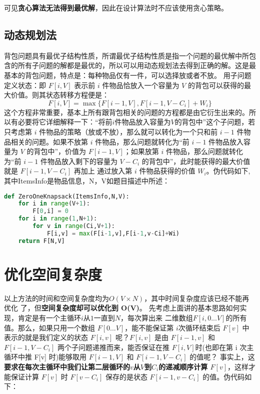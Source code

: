 可见\textbf{贪心算法无法得到最优解}，因此在设计算法时不应该使用贪心策略。

\subsection{动态规划法}
背包问题具有最优子结构性质，所谓最优子结构性质是指一个问题的最优解中所包含的所有子问题的解都是最优的，所以可以用动态规划法去得到正确的解。这是最基本的背包问题，特点是：每种物品仅有一件，可以选择放或者不放。
用子问题定义状态：即 $F[i, V]$ 表示前 $i$ 件物品恰放入一个容量为 $V$ 的背包可以获得的最大价值。则其状态转移方程便是：
$$
F[i, V] = \max{\{F[i-1, V], F[i-1, V-C_i] + W_i\}}
$$
这个方程非常重要，基本上所有跟背包相关的问题的方程都是由它衍生出来的。所
以有必要将它详细解释一下：“将前$i$件物品放入容量为$V$的背包中”这个子问题，若只考虑第 $i$ 件物品的策略（放或不放），那么就可以转化为一个只和前 $i-1$ 件物品相关的问题。如果不放第 $i$ 件物品，那么问题就转化为“前 $i-1$ 件物品放入容量为 $V$ 的背包中”，价值为 $F[i-1, V]$；如果放第 $i$ 件物品，那么问题就转化为“前 $i-1$ 件物品放入剩下的容量为 $V-C_i$ 的背包中”，此时能获得的最大价值就是 $F[i-1, V-C_i]$ 再加上
通过放入第 $i$ 件物品获得的价值 $W_i$。伪代码如下,其中ItemsInfo是物品信息，N，V如题目描述中所述：

\begin{lstlisting}[language=python, caption = 伪代码实现--ZeroOneKnapsack]
def ZeroOneKnapsack(ItemsInfo,N,V):
    for i in range(V+1):
        F[0,i] = 0
    for i in range(1,N+1):
        for v in range(Ci,V+1):
            F[i,v] = max(F[i-1,v],F[i-1,v-Ci]+Wi) 
    return F[N,V]
\end{lstlisting}

\section{优化空间复杂度}
以上方法的时间和空间复杂度均为$O(V \times N)$，其中时间复杂度应该已经不能再优化
了，但\textbf{空间复杂度却可以优化到 O(V)}。
先考虑上面讲的基本思路如何实现，肯定是有一个主循环$i$从$1$一直到$N$，每次算出来
二维数组$F[i, 0...V]$的所有值。那么，如果只用一个数组 $F[0...V]$，能不能保证第 $i$次循环结束后 $F[v]$ 中表示的就是我们定义的状态 $F[i, v]$ 呢？$F[i, v]$ 是由 $F[i-1, v]$ 和$F[i-1, V-C_i]$ 两个子问题递推而来，能否保证在推 $F[i, V]$时(也即在第 i 次主循环中推 F[v] 时)能够取用 $F[i-1, V]$ 和 $F[i-1, V-C_i]$ 的值呢？
事实上，这\textbf{要求在每次主循环中我们让第二层循环的$v$从$V$到$C_i$的递减顺序计算 $F[v]$}，这样才能保证计算 $F[v]$ 时 $F[v-C_i]$ 保存的是状态 $F[i-1,v-C_i]$ 的值。伪代码如下：

